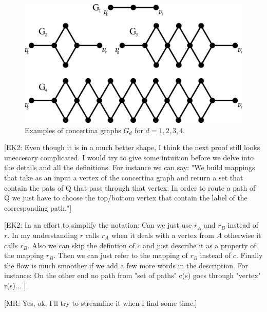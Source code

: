 \fi

\begin{figure}[th]
  \centering
  \includegraphics[scale=0.3]{figures/eps/tight}
  \caption{Examples of concertina graphs $G_d$ for $d=1,2,3,4$.}
  \label{fig:tightgraphs}
\end{figure}

[EK2: Even though it is in a much better shape, I think the next proof still looks uneccesary complicated. I would try to give some intuition before we delve into the details and all the definitions.
For instance we can say: "We build mappings that take as an input a vertex of the concertina graph and return a set that contain the pats of Q that pass through that vertex.
In order to route a path of Q we just have to choose the top/bottom vertex that contain the label of the corresponding path."]

[EK2: In an effort to simplify the notation: Can we just use $r_A$ and $r_B$ instead of $r$. In my understanding $r$ calls $r_A$ when
it deals with a vertex from $A$ otherwise it calls $r_B$. Also we can skip the defintion of $c$ and just describe it as a property of the 
mapping $r_B$. Then we can just refer to the mapping of $r_B$ instead of $c$. Finally the flow is much smoother if we add a few 
more words in the description. For instance: On the other end no path from "set of paths" c(s) goes through "vertex" r(s)...
]

[MR: Yes, ok, I'll try to streamline it when I find some time.]

